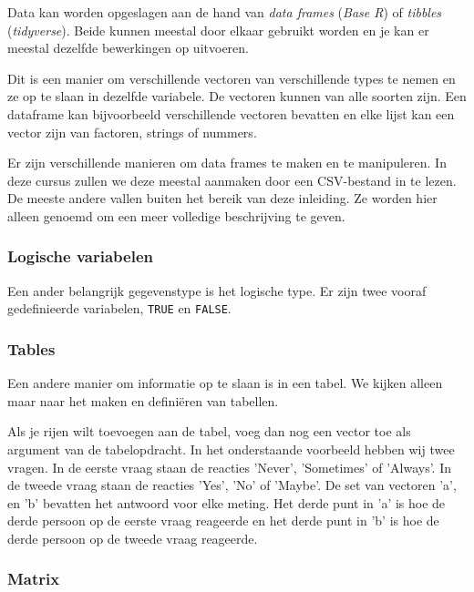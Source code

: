 Data kan worden opgeslagen aan de hand van \textit{data frames} (\textit{Base R}) of \textit{tibbles} (\textit{tidyverse}). Beide kunnen meestal door elkaar gebruikt worden en je kan er meestal dezelfde bewerkingen op uitvoeren.

Dit is een manier om verschillende vectoren van verschillende types te nemen en ze op te slaan in dezelfde variabele. De vectoren kunnen van alle soorten zijn. Een dataframe kan bijvoorbeeld verschillende vectoren bevatten en elke lijst kan een vector zijn van factoren, strings of nummers.

Er zijn verschillende manieren om data frames te maken en te manipuleren. In deze cursus zullen we deze meestal aanmaken door een CSV-bestand in te lezen. De meeste andere vallen buiten het bereik van deze inleiding. Ze worden hier alleen genoemd om een meer volledige beschrijving te geven. 



\subsubsection{Logische variabelen}

Een ander belangrijk gegevenstype is het logische type. Er zijn twee vooraf gedefinieerde variabelen, \texttt{TRUE} en \texttt{FALSE}.

\subsubsection{Tables}

Een andere  manier om informatie op te slaan is in een tabel.  We kijken alleen maar naar het maken en defini\"eren van tabellen. 



Als je rijen wilt toevoegen aan de tabel, voeg dan nog een vector toe als argument van de tabelopdracht. In het onderstaande voorbeeld hebben wij twee vragen. In de eerste vraag staan de reacties  'Never', 'Sometimes' of 'Always'. In de tweede vraag staan de reacties 'Yes', 'No' of 'Maybe'. De set van vectoren 'a', en 'b' bevatten het antwoord voor elke meting. Het derde punt in 'a' is hoe de derde persoon op de eerste vraag reageerde en het derde punt in 'b' is hoe de derde persoon op de tweede vraag reageerde.



\subsubsection{Matrix}


